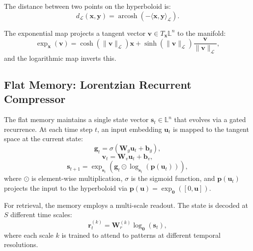 \documentclass[conference]{IEEEtran}
\begin{document}
The distance between two points on the hyperboloid is:
\begin{equation}
d_{\mathcal{L}}(\mathbf{x}, \mathbf{y}) = \operatorname{arcosh}(-\langle \mathbf{x}, \mathbf{y} \rangle_{\mathcal{L}}).
\label{eq:lorentz-dist}
\end{equation}

The exponential map projects a tangent vector $\mathbf{v} \in T_{\mathbf{x}}\mathbb{L}^n$ to the manifold:
\begin{equation}
\operatorname{exp}_{\mathbf{x}}(\mathbf{v}) = \cosh(\|\mathbf{v}\|_{\mathcal{L}})\mathbf{x} + \sinh(\|\mathbf{v}\|_{\mathcal{L}})\frac{\mathbf{v}}{\|\mathbf{v}\|_{\mathcal{L}}},
\label{eq:exp-map}
\end{equation}
and the logarithmic map inverts this.

\subsection{Flat Memory: Lorentzian Recurrent Compressor}

The flat memory maintains a single state vector $\mathbf{s}_t \in \mathbb{L}^n$ that evolves via a gated recurrence. At each time step $t$, an input embedding $\mathbf{u}_t$ is mapped to the tangent space at the current state:
\begin{equation}
\mathbf{g}_t = \sigma(\mathbf{W}_g \mathbf{u}_t + \mathbf{b}_g),
\label{eq:gate}
\end{equation}
\begin{equation}
\mathbf{v}_t = \mathbf{W}_v \mathbf{u}_t + \mathbf{b}_v,
\label{eq:proj}
\end{equation}
\begin{equation}
\mathbf{s}_{t+1} = \operatorname{exp}_{\mathbf{s}_t}\left(\mathbf{g}_t \odot \operatorname{log}_{\mathbf{s}_t}(\mathbf{p}(\mathbf{u}_t))\right),
\label{eq:update}
\end{equation}
where $\odot$ is element-wise multiplication, $\sigma$ is the sigmoid function, and $\mathbf{p}(\mathbf{u}_t)$ projects the input to the hyperboloid via $\mathbf{p}(\mathbf{u}) = \operatorname{exp}_{\mathbf{0}}([0, \mathbf{u}])$.

For retrieval, the memory employs a multi-scale readout. The state is decoded at $S$ different time scales:
\begin{equation}
\mathbf{r}_t^{(k)} = \mathbf{W}_r^{(k)} \operatorname{log}_{\mathbf{0}}(\mathbf{s}_t),
\label{eq:readout}
\end{equation}
where each scale $k$ is trained to attend to patterns at different temporal resolutions.
\end{document}
